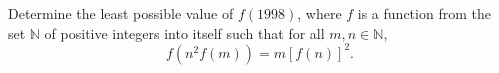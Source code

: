 Determine the least possible value of $f(1998)$, where $f$ is a function from the set $\mathbb{N}$ of positive integers into itself such that for all $m, n \in \mathbb{N}$,
\[ f(n^2 f(m)) = m[f(n)]^2. \]
